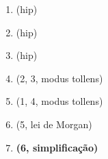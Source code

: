 \begin{Gabarito}{12}
\begin{enumerate}[a)]
\begin{multicols}{2}
        \columnbreak

        \begin{enumerate}[\ding{32}]
          \item (hip)
          \item (hip)
          \item (hip)
          \item (2, 3, modus tollens)
          \item (1, 4, modus tollens)
          \item (5, lei de Morgan)
          \item \textbf{(6, simplificação)}
        \end{enumerate}

      \end{multicols}

    \end{enumerate}
  
\end{Gabarito}
